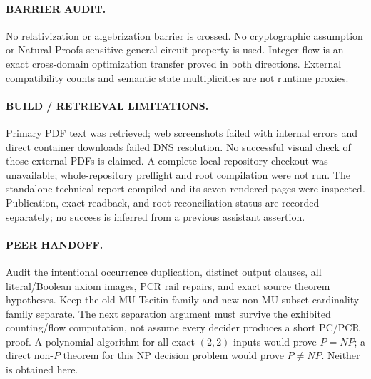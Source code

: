 \documentclass[11pt]{article}
\begin{document}
\paragraph{BARRIER AUDIT.}
No relativization or algebrization barrier is crossed. No cryptographic assumption or Natural-Proofs-sensitive general circuit property is used. Integer flow is an exact cross-domain optimization transfer proved in both directions. External compatibility counts and semantic state multiplicities are not runtime proxies.

\paragraph{BUILD / RETRIEVAL LIMITATIONS.}
Primary PDF text was retrieved; web screenshots failed with internal errors and direct container downloads failed DNS resolution. No successful visual check of those external PDFs is claimed. A complete local repository checkout was unavailable; whole-repository preflight and root compilation were not run. The standalone technical report compiled and its seven rendered pages were inspected. Publication, exact readback, and root reconciliation status are recorded separately; no success is inferred from a previous assistant assertion.

\paragraph{PEER HANDOFF.}
Audit the intentional occurrence duplication, distinct output clauses, all literal/Boolean axiom images, PCR rail repairs, and exact source theorem hypotheses. Keep the old MU Tseitin family and new non-MU subset-cardinality family separate. The next separation argument must survive the exhibited counting/flow computation, not assume every decider produces a short PC/PCR proof. A polynomial algorithm for all exact-$(2,2)$ inputs would prove $P=NP$; a direct non-$P$ theorem for this NP decision problem would prove $P\ne NP$. Neither is obtained here.
\end{document}
